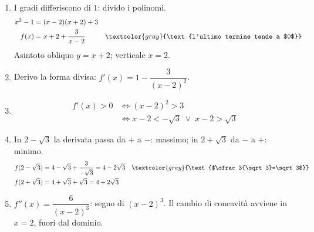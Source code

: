 \begin{question}[ID=2.3, subtitle={Studio completo di una funzione razionale fratta}, difficulty=media, tags={funzioni, studio di funzione, funzioni razionali}]
\begin{explanation}
\begin{enumerate}
    \item I gradi differiscono di $1$: divido i polinomi.
    \[\begin{aligned}
    x^2-1 &= (x-2)(x+2)+3\\
    f(x) &= x+2+\dfrac{3}{x-2} && \textcolor{gray}{\text{l'ultimo termine tende a $0$}}
    \end{aligned}\]
    Asintoto obliquo $y=x+2$; verticale $x=2$.
    \item Derivo la forma divisa: $f'(x)=1-\dfrac{3}{(x-2)^2}$.
    \item \[\begin{aligned}
    f'(x)>0 &\iff (x-2)^2>3\\
    &\iff x-2<-\sqrt3 \;\vee\; x-2>\sqrt3
    \end{aligned}\]
    \item In $2-\sqrt3$ la derivata passa da $+$ a $-$: massimo; in $2+\sqrt3$ da $-$ a $+$: minimo.
    \[\begin{aligned}
    f(2-\sqrt3) &= 4-\sqrt3+\dfrac{3}{-\sqrt3}=4-2\sqrt3 && \textcolor{gray}{\text{$\dfrac3{\sqrt3}=\sqrt3$}}\\
    f(2+\sqrt3) &= 4+\sqrt3+\sqrt3=4+2\sqrt3
    \end{aligned}\]
    \item $f''(x)=\dfrac{6}{(x-2)^3}$: segno di $(x-2)^3$. Il cambio di concavità avviene in $x=2$, fuori dal dominio.
\end{enumerate}
\end{explanation}
\end{question}


